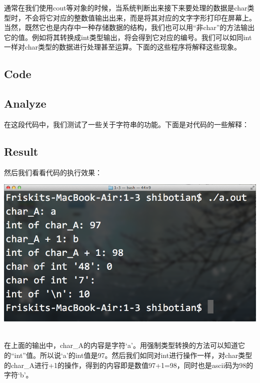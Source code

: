 通常在我们使用cout等对象的时候，当系统判断出来接下来要处理的数据是char类型时，不会将它对应的整数值输出出来，而是将其对应的文字字形打印在屏幕上。当然，既然它也是内存中一种存储数据的结构，我们也可以用“非char”的方法输出它的值。例如将其转换成int类型输出，将会得到它对应的编号。我们可以如同int一样对char类型的数据进行处理甚至运算。下面的这些程序将解释这些现象。

\subsection{Code}



\subsection{Analyze}
在这段代码中，我们测试了一些关于字符串的功能。下面是对代码的一些解释：
\showremarks

\subsection{Result}
然后我们看看代码的执行效果：
\\[\intextsep] 
  \begin{minipage}{\textwidth} 
    \centering 
    \includegraphics{codes/1-3/result.png}
    \label{fig:code-1-3-result} 
  \end{minipage} 
\\[\intextsep] 

在上面的输出中，char\_A的内容是字符‘a’。用强制类型转换的方法可以知道它的“int”值。所以说‘a’的int值是97。然后我们如同对int进行操作一样，对char类型的char\_A进行+1的操作，得到的内容即是数值97+1=98，同时也是ascii码为98的字符‘b’。

